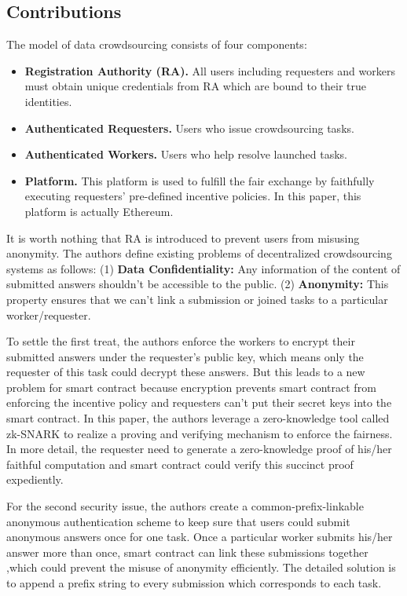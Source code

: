 \documentclass[conference]{IEEEtran}
\begin{document}
\subsection{Contributions}
The model of data crowdsourcing consists of four components:
\begin{itemize}
    \item \textbf{Registration Authority (RA).} All users including requesters and workers must obtain unique credentials from RA which are bound to their true identities.
    \item \textbf{Authenticated Requesters.} Users who issue crowdsourcing tasks.
    \item \textbf{Authenticated Workers.} Users who help resolve launched tasks.
    \item \textbf{Platform.} This platform is used to fulfill the fair exchange by faithfully executing requesters' pre-defined incentive policies. In this paper, this platform is actually Ethereum. 
\end{itemize} 

It is worth nothing that RA is introduced to prevent users from misusing anonymity. 
%
The authors define existing problems of decentralized crowdsourcing systems as follows: 
(1) \textbf{Data Confidentiality:} Any information of the content of submitted answers shouldn't be accessible to the public.  
(2) \textbf{Anonymity:} This property ensures that we can't link a submission or joined tasks to a particular worker/requester.

To settle the first treat, the authors enforce the workers to encrypt their submitted answers under the requester's public key, which means only the requester of this task could decrypt these answers.
%
But this leads to a new problem for smart contract because encryption prevents smart contract from enforcing the incentive policy and requesters can't put their secret keys into the smart contract.
%
In this paper, the authors leverage a zero-knowledge tool called zk-SNARK to realize a proving and verifying mechanism to enforce the fairness.
%
In more detail, the requester need to generate a zero-knowledge proof of his/her faithful computation and smart contract could verify this succinct proof expediently.

For the second security issue, the authors create a common-prefix-linkable anonymous authentication scheme to keep sure that users could submit anonymous answers once for one task.
%
Once a particular worker submits his/her answer more than once, smart contract can link these submissions together ,which could prevent the misuse of anonymity efficiently.
%
The detailed solution is to append a prefix string to every submission which corresponds to each task.
\end{document}

